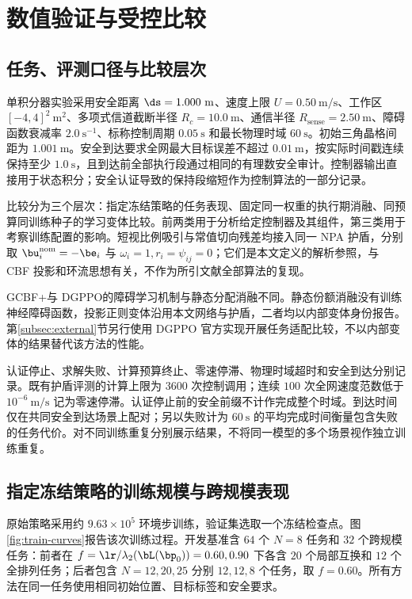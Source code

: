 \section{数值验证与受控比较}\label{sec:experiments}

\subsection{任务、评测口径与比较层次}
单积分器实验采用安全距离 $\ds=1.000\ \mathrm m$、速度上限 $U=0.50\ \mathrm{m/s}$、工作区 $[-4,4]^2\ \mathrm m^2$、多项式信道截断半径 $R_c=10.0\ \mathrm m$、通信半径 $R_{\mathrm{sense}}=2.50\ \mathrm m$、障碍函数衰减率 $2.0\ \mathrm s^{-1}$、标称控制周期 $0.05\ \mathrm s$ 和最长物理时域 $60\ \mathrm s$。初始三角晶格间距为 $1.001\ \mathrm m$。安全到达要求全网最大目标误差不超过 $0.01\ \mathrm m$，按实际时间戳连续保持至少 $1.0\ \mathrm s$，且到达前全部执行段通过相同的有理数安全审计。控制器输出直接用于状态积分；安全认证导致的保持段缩短作为控制算法的一部分记录。

比较分为三个层次：指定冻结策略的任务表现、固定同一权重的执行期消融、同预算同训练种子的学习变体比较。前两类用于分析给定控制器及其组件，第三类用于考察训练配置的影响。短视比例吸引与常值切向残差均接入同一 NPA 护盾，分别取 $\bu_i^{\mathrm{nom}}=-\be_i$ 与 $\omega_i=1,r_i=\psi_{ij}=0$；它们是本文定义的解析参照，与 CBF 投影和环流思想有关\cite{ames2017cbf,goncalves2023circulation}，不作为所引文献全部算法的复现。

GCBF+\cite{zhang2025gcbf}与 DGPPO\cite{zhang2025dgppo}的障碍学习机制与静态分配消融不同。静态份额消融没有训练神经障碍函数，投影正则变体沿用本文网络与护盾，二者均以内部变体身份报告。第\ref{subsec:external}节另行使用 DGPPO 官方实现开展任务适配比较，不以内部变体的结果替代该方法的性能。

认证停止、求解失败、计算预算终止、零速停滞、物理时域超时和安全到达分别记录。既有护盾评测的计算上限为 $3600$ 次控制调用；连续 $100$ 次全网速度范数低于 $10^{-6}\ \mathrm{m/s}$ 记为零速停滞。认证停止前的安全前缀不计作完成整个时域。到达时间仅在共同安全到达场景上配对；另以失败计为 $60\ \mathrm s$ 的平均完成时间衡量包含失败的任务代价。对不同训练重复分别展示结果，不将同一模型的多个场景视作独立训练重复。

\subsection{指定冻结策略的训练规模与跨规模表现}
原始策略采用约 $9.63\times10^5$ 环境步训练，验证集选取一个冻结检查点。图\ref{fig:train-curves}报告该次训练过程。开发基准含 $64$ 个 $N=8$ 任务和 $32$ 个跨规模任务：前者在 $f=\lr/\lambda_2(\bL(\bp_0))=0.60,0.90$ 下各含 $20$ 个局部互换和 $12$ 个全排列任务；后者包含 $N=12,20,25$ 分别 $12,12,8$ 个任务，取 $f=0.60$。所有方法在同一任务使用相同初始位置、目标标签和安全要求。

